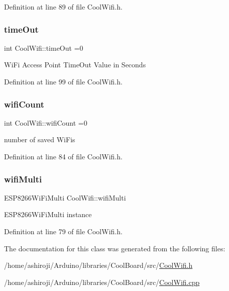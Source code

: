Definition at line 89 of file Cool\+Wifi.\+h.

\mbox{\label{class_cool_wifi_a952111605f25156588b5632caaba1c6f}} 
\subsubsection{\texorpdfstring{time\+Out}{timeOut}}
{\footnotesize\ttfamily int Cool\+Wifi\+::time\+Out =0\hspace{0.3cm}{\ttfamily [private]}}

Wi\+Fi Access Point Time\+Out Value in Seconds 

Definition at line 99 of file Cool\+Wifi.\+h.

\mbox{\label{class_cool_wifi_ab133bd92fcb895b884deecd6678592e4}} 
\subsubsection{\texorpdfstring{wifi\+Count}{wifiCount}}
{\footnotesize\ttfamily int Cool\+Wifi\+::wifi\+Count =0\hspace{0.3cm}{\ttfamily [private]}}

number of saved Wi\+Fi\textquotesingle{}s 

Definition at line 84 of file Cool\+Wifi.\+h.

\mbox{\label{class_cool_wifi_a7862a8c0d7239877e2956c14a368aab8}} 
\subsubsection{\texorpdfstring{wifi\+Multi}{wifiMulti}}
{\footnotesize\ttfamily E\+S\+P8266\+Wi\+Fi\+Multi Cool\+Wifi\+::wifi\+Multi\hspace{0.3cm}{\ttfamily [private]}}

E\+S\+P8266\+Wi\+Fi\+Multi instance 

Definition at line 79 of file Cool\+Wifi.\+h.



The documentation for this class was generated from the following files\+:\begin{DoxyCompactItemize}
\item 
/home/ashiroji/\+Arduino/libraries/\+Cool\+Board/src/\hyperlink{_cool_wifi_8h}{Cool\+Wifi.\+h}\item 
/home/ashiroji/\+Arduino/libraries/\+Cool\+Board/src/\hyperlink{_cool_wifi_8cpp}{Cool\+Wifi.\+cpp}\end{DoxyCompactItemize}
